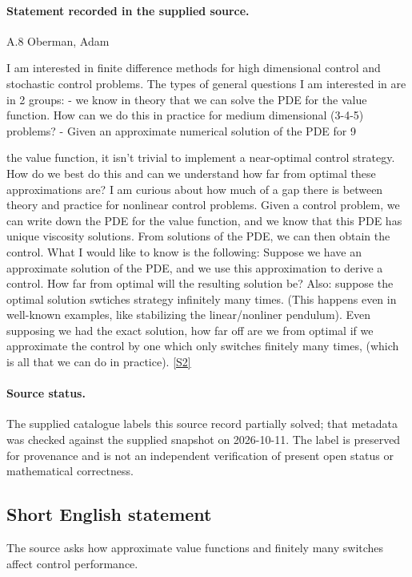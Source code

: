 \documentclass[11pt]{article}
\begin{document}
\paragraph{Statement recorded in the supplied source.}
A.8 Oberman, Adam

I am interested in finite difference methods for high dimensional control and stochastic control problems. The types of general questions I am interested in are in 2 groups: - we know in theory that we can solve the PDE for the value function. How can we do this in practice for medium dimensional (3-4-5) problems? - Given an approximate numerical solution of the PDE for 9

the value function, it isn't trivial to implement a near-optimal control strategy. How do we best do this and can we understand how far from optimal these approximations are? I am curious about how much of a gap there is between theory and practice for nonlinear control problems. Given a control problem, we can write down the PDE for the value function, and we know that this PDE has unique viscosity solutions. From solutions of the PDE, we can then obtain the control. What I would like to know is the following: Suppose we have an approximate solution of the PDE, and we use this approximation to derive a control. How far from optimal will the resulting solution be? Also: suppose the optimal solution swtiches strategy infinitely many times. (This happens even in well-known examples, like stabilizing the linear/nonliner pendulum). Even supposing we had the exact solution, how far off are we from optimal if we approximate the control by one which only switches finitely many times, (which is all that we can do in practice). \href{https://aimath.org/WWN/optimalcontrol/optimalcontrol.pdf}{[S2]}
\paragraph{Source status.}
The supplied catalogue labels this source record partially solved; that metadata was checked against the supplied snapshot on 2026-10-11. The label is preserved for provenance and is not an independent verification of present open status or mathematical correctness.
\subsection{Short English statement}
The source asks how approximate value functions and finitely many switches affect control performance.
\end{document}
